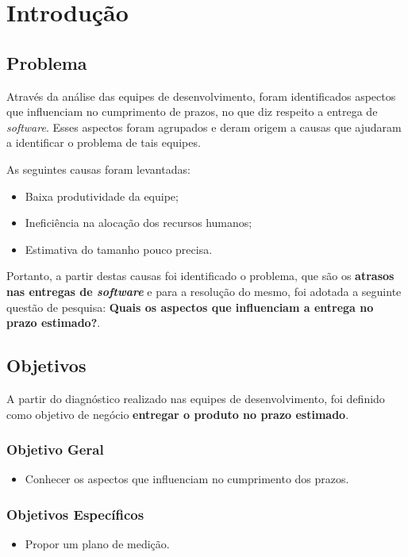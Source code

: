 \chapter[Introdução]{Introdução}

\section{Problema}

Através da análise das equipes de desenvolvimento, foram identificados aspectos que influenciam no cumprimento de prazos, 
no que diz respeito a entrega de \textit{software}. Esses aspectos foram agrupados e deram origem a causas que ajudaram  a 
identificar o problema de tais equipes.

As seguintes causas foram levantadas:
\begin{itemize}
 \item Baixa produtividade da equipe;
 \item Ineficiência na alocação dos recursos humanos;
 \item Estimativa do tamanho pouco precisa.
\end{itemize}

Portanto, a partir destas causas foi identificado o problema, que são os \textbf{atrasos nas entregas de \textit{software}} 
e para a resolução do mesmo, foi adotada a seguinte questão de pesquisa: \textbf{Quais os aspectos que influenciam a 
entrega no prazo estimado?}.

\vfill
\pagebreak
  
\section{Objetivos}

A partir do diagnóstico realizado nas equipes de desenvolvimento, foi definido como objetivo de negócio \textbf{entregar o 
produto no prazo estimado}.

\subsection{Objetivo Geral}

\begin{itemize}
  \item Conhecer os aspectos que influenciam no cumprimento dos prazos.
\end{itemize}

\subsection{Objetivos Específicos}

\begin{itemize}
  \item Propor um plano de medição.
\end{itemize}

\vfill
\pagebreak

